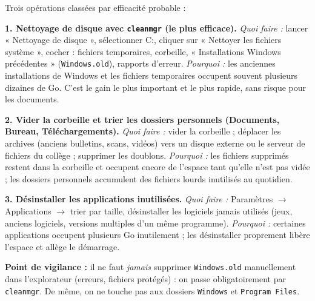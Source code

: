 \documentclass[11pt]{article}
\begin{document}
\begin{corrige}
Trois opérations classées par efficacité probable :

\textbf{1. Nettoyage de disque avec \texttt{cleanmgr} (le plus efficace).}
\emph{Quoi faire :} lancer « Nettoyage de disque », sélectionner C:, cliquer sur « Nettoyer les fichiers système », cocher : fichiers temporaires, corbeille, « Installations Windows précédentes » (\texttt{Windows.old}), rapports d'erreur.
\emph{Pourquoi :} les anciennes installations de Windows et les fichiers temporaires occupent souvent plusieurs dizaines de Go. C'est le gain le plus important et le plus rapide, sans risque pour les documents.

\textbf{2. Vider la corbeille et trier les dossiers personnels (Documents, Bureau, Téléchargements).}
\emph{Quoi faire :} vider la corbeille ; déplacer les archives (anciens bulletins, scans, vidéos) vers un disque externe ou le serveur de fichiers du collège ; supprimer les doublons.
\emph{Pourquoi :} les fichiers supprimés restent dans la corbeille et occupent encore de l'espace tant qu'elle n'est pas vidée ; les dossiers personnels accumulent des fichiers lourds inutilisés au quotidien.

\textbf{3. Désinstaller les applications inutilisées.}
\emph{Quoi faire :} Paramètres $\to$ Applications $\to$ trier par taille, désinstaller les logiciels jamais utilisés (jeux, anciens logiciels, versions multiples d'un même programme).
\emph{Pourquoi :} certaines applications occupent plusieurs Go inutilement ; les désinstaller proprement libère l'espace et allège le démarrage.

\textbf{Point de vigilance :} il ne faut \emph{jamais} supprimer \texttt{Windows.old} manuellement dans l'explorateur (erreurs, fichiers protégés) : on passe obligatoirement par \texttt{cleanmgr}. De même, on ne touche pas aux dossiers \texttt{Windows} et \texttt{Program Files}.
\end{corrige}
\end{document}
